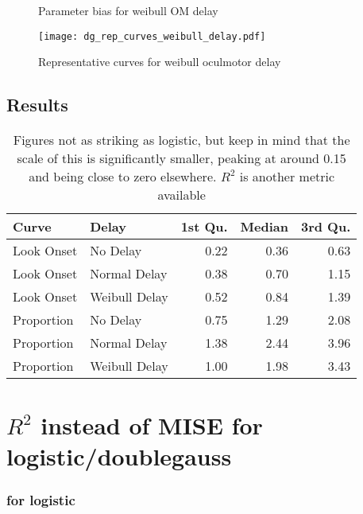 \begin{figure}[H]
\centering

\caption{Parameter bias for weibull OM delay}
\label{fig:dg_par_bias_weibull_delay}
\end{figure}

\begin{figure}[H]
\centering
\texttt{[image: dg\_rep\_curves\_weibull\_delay.pdf]}
\caption{Representative curves for weibull oculmotor delay}
\label{fig:dg_rep_curves_weibull_delay}
\end{figure}
\subsection{Results}

\begin{table}[ht]
\centering
\begin{tabular}{llrrr}
  \hline
Curve & Delay & 1st Qu. & Median & 3rd Qu. \\ 
  \hline
Look Onset & No Delay & 0.22 & 0.36 & 0.63 \\ 
  Look Onset & Normal Delay & 0.38 & 0.70 & 1.15 \\ 
  Look Onset & Weibull Delay & 0.52 & 0.84 & 1.39 \\ 
  Proportion & No Delay & 0.75 & 1.29 & 2.08 \\ 
  Proportion & Normal Delay & 1.38 & 2.44 & 3.96 \\ 
  Proportion & Weibull Delay & 1.00 & 1.98 & 3.43 \\ 
   \hline
\end{tabular}
\caption{Figures not as striking as logistic, but keep in mind that the scale of this is significantly smaller, peaking at around 0.15 and being close to zero elsewhere. $R^2$ is another metric available}
\label{tab:dg_mise_sims}
\end{table}

\section*{$R^2$ instead of MISE for logistic/doublegauss}


\subsubsection{for logistic}


